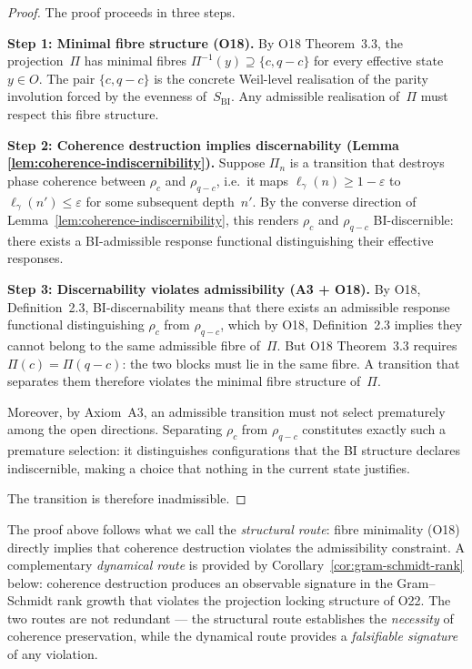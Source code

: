   \begin{proof}
    The proof proceeds in three steps.

    \textbf{Step 1: Minimal fibre structure (O18).}
    By O18 Theorem~3.3, the projection~$\Pi$ has minimal fibres
    $\Pi^{-1}(y) \supseteq \{c, q-c\}$ for every effective state~$y \in O$.
    The pair $\{c, q-c\}$ is the concrete Weil-level realisation of the parity
    involution forced by the evenness of~$S_{\mathrm{BI}}$.
    Any admissible realisation of~$\Pi$ must respect this fibre structure.

    \textbf{Step 2: Coherence destruction implies discernability (Lemma
    \ref{lem:coherence-indiscernibility}).}
    Suppose $\Pi_n$ is a transition that destroys phase coherence between
    $\rho_c$ and $\rho_{q-c}$, i.e.\ it maps $\ell_\gamma(n) \geq 1 - \varepsilon$
    to $\ell_\gamma(n') \leq \varepsilon$ for some subsequent depth~$n'$.
    By the converse direction of
    Lemma~\ref{lem:coherence-indiscernibility}, this renders $\rho_c$ and
    $\rho_{q-c}$ BI-discernible: there exists a BI-admissible response
    functional distinguishing their effective responses.

    \textbf{Step 3: Discernability violates admissibility (A3 + O18).}
    By O18, Definition~2.3, BI-discernability means that there exists an
    admissible response functional distinguishing $\rho_c$ from $\rho_{q-c}$,
    which by O18, Definition~2.3 implies they cannot belong to the same
    admissible fibre of~$\Pi$.
    But O18 Theorem~3.3 requires $\Pi(c) = \Pi(q-c)$: the two blocks must lie
    in the same fibre.
    A transition that separates them therefore violates the minimal fibre
    structure of~$\Pi$.

    Moreover, by Axiom~A3, an admissible transition must not select prematurely
    among the open directions.
    Separating $\rho_c$ from $\rho_{q-c}$ constitutes exactly such a premature
    selection: it distinguishes configurations that the BI structure declares
    indiscernible, making a choice that nothing in the current state justifies.

    The transition is therefore inadmissible.
  \end{proof}

  \begin{remark}
    \label{rem:two-routes}
    The proof above follows what we call the \emph{structural route}: fibre
    minimality (O18) directly implies that coherence destruction violates
    the admissibility constraint.
    A complementary \emph{dynamical route} is provided by
    Corollary~\ref{cor:gram-schmidt-rank} below: coherence destruction
    produces an observable signature in the Gram--Schmidt rank growth that
    violates the projection locking structure of O22.
    The two routes are not redundant — the structural route establishes the
    \emph{necessity} of coherence preservation, while the dynamical route
    provides a \emph{falsifiable signature} of any violation.
  \end{remark}

